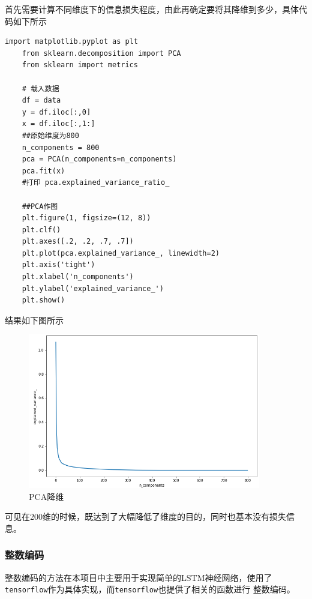 \documentclass[UTF8]{ctexart}
\begin{document}
\begin{itemize}
    首先需要计算不同维度下的信息损失程度，由此再确定要将其降维到多少，具体代码如下所示
    \begin{lstlisting}[]
    import matplotlib.pyplot as plt
    from sklearn.decomposition import PCA
    from sklearn import metrics
    
    # 载入数据
    df = data
    y = df.iloc[:,0]
    x = df.iloc[:,1:]
    ##原始维度为800
    n_components = 800
    pca = PCA(n_components=n_components)
    pca.fit(x)
    #打印 pca.explained_variance_ratio_

    ##PCA作图
    plt.figure(1, figsize=(12, 8))
    plt.clf()
    plt.axes([.2, .2, .7, .7])
    plt.plot(pca.explained_variance_, linewidth=2)
    plt.axis('tight')
    plt.xlabel('n_components')
    plt.ylabel('explained_variance_')
    plt.show()
    \end{lstlisting}
    结果如下图所示
    \begin{figure}[htb]
        \centering
        \includegraphics[width=4in]{asset/pca降维分析.png}
        \caption{PCA降维} %
    \end{figure}
    可见在200维的时候，既达到了大幅降低了维度的目的，同时也基本没有损失信息。
\end{itemize}
\newpage
\subsubsection*{整数编码}
整数编码的方法在本项目中主要用于实现简单的LSTM神经网络，使用了\lstinline{tensorflow}作为具体实现，而\lstinline{tensorflow}也提供了相关的函数进行
整数编码。
\end{document}
